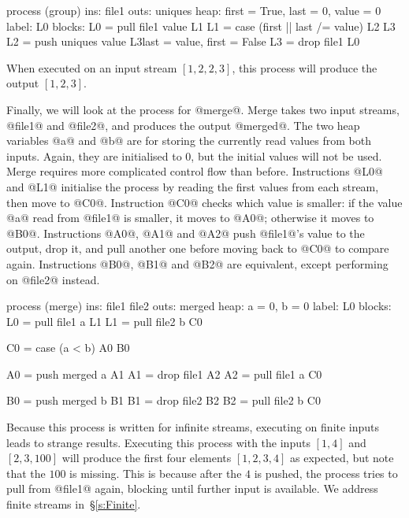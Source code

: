 \begin{code}
process (group)
     ins: file1
    outs: uniques
    heap: {first = True, last = 0, value = 0}
   label: L0
  blocks: L0 = pull file1   value              L1
          L1 = case (first || last /= value)   L2               L3
          L2 = push uniques value              L3{last = value, first = False}
          L3 = drop file1                      L0
\end{code}

When executed on an input stream $[1, 2, 2, 3]$, this process will produce the output $[1, 2, 3]$.

Finally, we will look at the process for @merge@.
Merge takes two input streams, @file1@ and @file2@, and produces the output @merged@.
The two heap variables @a@ and @b@ are for storing the currently read values from both inputs.
Again, they are initialised to $0$, but the initial values will not be used.
Merge requires more complicated control flow than before.
Instructions @L0@ and @L1@ initialise the process by reading the first values from each stream, then move to @C0@.
Instruction @C0@ checks which value is smaller: if the value @a@ read from @file1@ is smaller, it moves to @A0@; otherwise it moves to @B0@.
Instructions @A0@, @A1@ and @A2@ push @file1@'s value to the output, drop it, and pull another one before moving back to @C0@ to compare again.
Instructions @B0@, @B1@ and @B2@ are equivalent, except performing on @file2@ instead.

\begin{code}
process (merge)
     ins: file1 file2
    outs: merged
    heap: {a = 0, b = 0}
   label: L0
  blocks: L0 = pull file1 a  L1
          L1 = pull file2 b  C0

          C0 = case (a < b)  A0     B0

          A0 = push merged a A1
          A1 = drop file1    A2
          A2 = pull file1  a C0

          B0 = push merged b B1
          B1 = drop file2    B2
          B2 = pull file2  b C0
\end{code}



Because this process is written for infinite streams, executing on finite inputs leads to strange results.
Executing this process with the inputs $[1, 4]$ and $[2, 3, 100]$ will produce the first four elements $[1, 2, 3, 4]$ as expected, but note that the $100$ is missing.
This is because after the $4$ is pushed, the process tries to pull from @file1@ again, blocking until further input is available.
We address finite streams in~\S\ref{s:Finite}.

